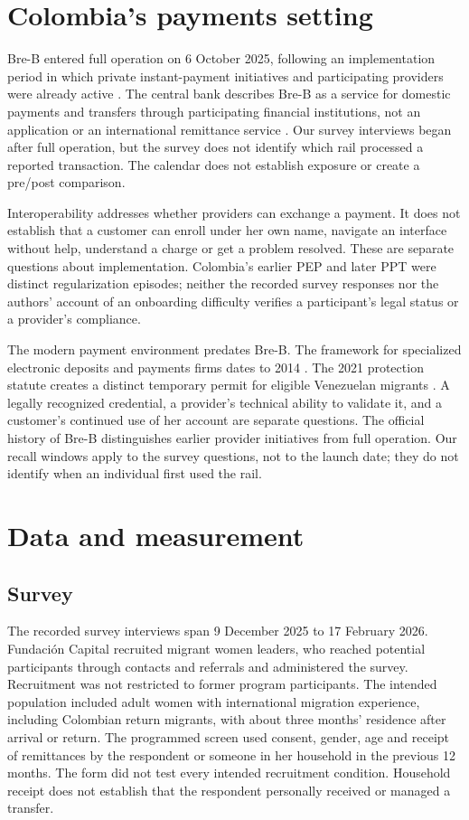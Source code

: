 \documentclass[12pt]{article}
\begin{document}
\section{Colombia's payments setting}
Bre-B entered full operation on 6 October 2025, following an implementation period in which private instant-payment initiatives and participating providers were already active \citep{banrep2026}. The central bank describes Bre-B as a service for domestic payments and transfers through participating financial institutions, not an application or an international remittance service \citep{banrepfaq}. Our survey interviews began after full operation, but the survey does not identify which rail processed a reported transaction. The calendar does not establish exposure or create a pre/post comparison.

Interoperability addresses whether providers can exchange a payment. It does not establish that a customer can enroll under her own name, navigate an interface without help, understand a charge or get a problem resolved. These are separate questions about implementation. Colombia's earlier PEP and later PPT were distinct regularization episodes; neither the recorded survey responses nor the authors' account of an onboarding difficulty verifies a participant's legal status or a provider's compliance.

The modern payment environment predates Bre-B. The framework for specialized electronic deposits and payments firms dates to 2014 \citep{law1735}. The 2021 protection statute creates a distinct temporary permit for eligible Venezuelan migrants \citep{decree216}. A legally recognized credential, a provider's technical ability to validate it, and a customer's continued use of her account are separate questions. The official history of Bre-B distinguishes earlier provider initiatives from full operation. Our recall windows apply to the survey questions, not to the launch date; they do not identify when an individual first used the rail.

\section{Data and measurement}
\subsection{Survey}

The recorded survey interviews span 9 December 2025 to 17 February 2026. Fundación Capital recruited migrant women leaders, who reached potential participants through contacts and referrals and administered the survey. Recruitment was not restricted to former program participants. The intended population included adult women with international migration experience, including Colombian return migrants, with about three months' residence after arrival or return. The programmed screen used consent, gender, age and receipt of remittances by the respondent or someone in her household in the previous 12 months. The form did not test every intended recruitment condition. Household receipt does not establish that the respondent personally received or managed a transfer.
\end{document}
